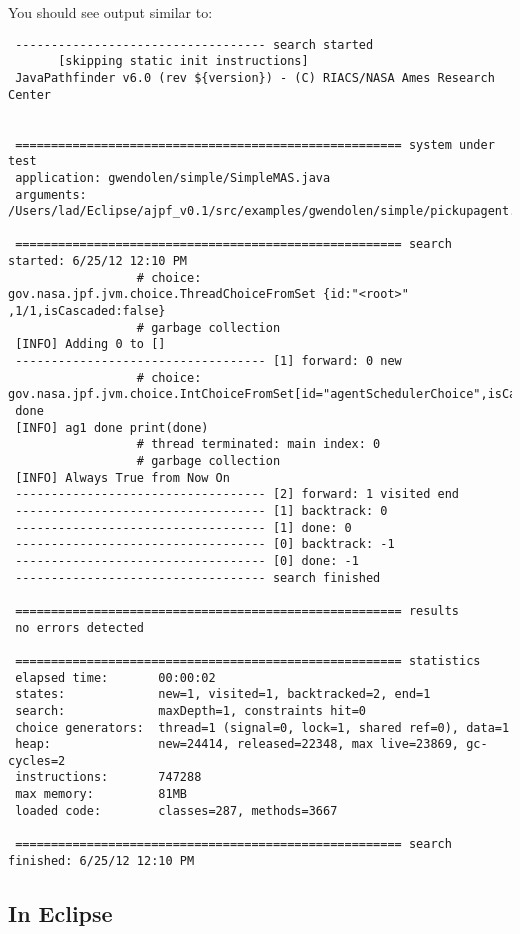 You should see output similar to: 

\noindent \begin{lstlisting}
 ----------------------------------- search started
       [skipping static init instructions]
 JavaPathfinder v6.0 (rev ${version}) - (C) RIACS/NASA Ames Research Center
 
 
 ====================================================== system under test
 application: gwendolen/simple/SimpleMAS.java
 arguments:   /Users/lad/Eclipse/ajpf_v0.1/src/examples/gwendolen/simple/pickupagent.gwen 
 
 ====================================================== search started: 6/25/12 12:10 PM
                  # choice: gov.nasa.jpf.jvm.choice.ThreadChoiceFromSet {id:"<root>" ,1/1,isCascaded:false}
                  # garbage collection
 [INFO] Adding 0 to []
 ----------------------------------- [1] forward: 0 new
                  # choice: gov.nasa.jpf.jvm.choice.IntChoiceFromSet[id="agentSchedulerChoice",isCascaded:false,>0]
 done
 [INFO] ag1 done print(done)
                  # thread terminated: main index: 0
                  # garbage collection
 [INFO] Always True from Now On
 ----------------------------------- [2] forward: 1 visited end
 ----------------------------------- [1] backtrack: 0
 ----------------------------------- [1] done: 0
 ----------------------------------- [0] backtrack: -1
 ----------------------------------- [0] done: -1
 ----------------------------------- search finished
 
 ====================================================== results
 no errors detected
 
 ====================================================== statistics
 elapsed time:       00:00:02
 states:             new=1, visited=1, backtracked=2, end=1
 search:             maxDepth=1, constraints hit=0
 choice generators:  thread=1 (signal=0, lock=1, shared ref=0), data=1
 heap:               new=24414, released=22348, max live=23869, gc-cycles=2
 instructions:       747288
 max memory:         81MB
 loaded code:        classes=287, methods=3667
 
 ====================================================== search finished: 6/25/12 12:10 PM
\end{lstlisting}

\subsection{In Eclipse}

